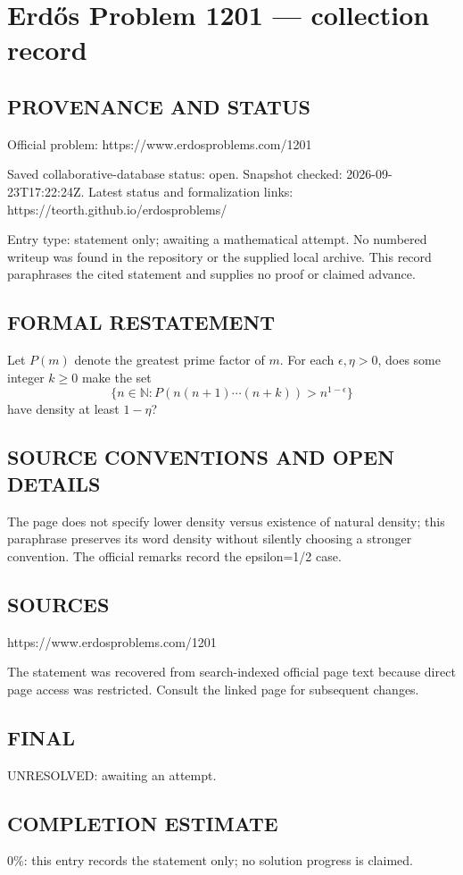 \section*{Erd\H{o}s Problem 1201 --- collection record}

\subsection*{PROVENANCE AND STATUS}
Official problem: https://www.erdosproblems.com/1201

Saved collaborative-database status: open.
Snapshot checked: 2026-09-23T17:22:24Z.
Latest status and formalization links: https://teorth.github.io/erdosproblems/

Entry type: statement only; awaiting a mathematical attempt. No numbered writeup was found in the repository or the supplied local archive. This record paraphrases the cited statement and supplies no proof or claimed advance.

\subsection*{FORMAL RESTATEMENT}
Let $P(m)$ denote the greatest prime factor of $m$. For each $\epsilon,\eta>0$, does some integer $k\geq0$ make the set
\[\{n\in\mathbb N:P(n(n+1)\cdots(n+k))>n^{1-\epsilon}\}\]
have density at least $1-\eta$?

\subsection*{SOURCE CONVENTIONS AND OPEN DETAILS}
The page does not specify lower density versus existence of natural density; this paraphrase preserves its word density without silently choosing a stronger convention. The official remarks record the epsilon=1/2 case.

\subsection*{SOURCES}
https://www.erdosproblems.com/1201

The statement was recovered from search-indexed official page text because direct page access was restricted. Consult the linked page for subsequent changes.

\subsection*{FINAL}
UNRESOLVED: awaiting an attempt.

\subsection*{COMPLETION ESTIMATE}
$0\%$: this entry records the statement only; no solution progress is claimed.

